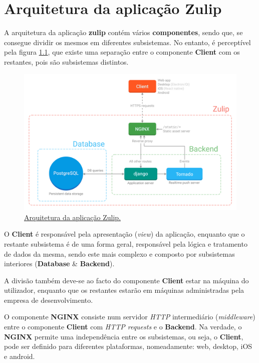 \chapter{Arquitetura da aplicação Zulip}

A arquitetura da aplicação \textbf{zulip} contém vários \textbf{componentes}, sendo que, se consegue dividir os mesmos em diferentes subsistemas. No entanto, é perceptível pela figura \ref{img:arquitetura-zulip}, que existe uma separação entre o componente \textbf{Client} com os restantes, pois são subsistemas distintos.
\newline

\begin{figure}[H]
	\centering
	\includegraphics[scale=0.28]{images/architecture.png}
	\caption{\href{https://zulip.readthedocs.io/en/latest/overview/architecture-overview.html}{Arquitetura da aplicação Zulip.}}
	\label{img:arquitetura-zulip}
\end{figure}

O \textbf{Client} é responsável pela apresentação (\emph{view}) da aplicação, enquanto que o restante subsistema é de uma forma geral, responsável pela lógica e tratamento de dados da mesma, sendo este mais complexo e composto por subsistemas interiores (\textbf{Database} \& \textbf{Backend}).
\newline

A divisão também deve-se ao facto do componente \textbf{Client} estar na máquina do utilizador, enquanto que os restantes estarão em máquinas administradas pela empresa de desenvolvimento.
\newline

O componente \textbf{NGINX} consiste num servidor \emph{HTTP} intermediário (\emph{middleware}) entre o componente \textbf{Client} com \emph{HTTP requests} e o \textbf{Backend}. Na verdade, o \textbf{NGINX} permite uma independência entre os subsistemas, ou seja, o \textbf{Client}, pode ser definido para diferentes plataformas, nomeadamente: web, desktop, iOS e android.
\newline

